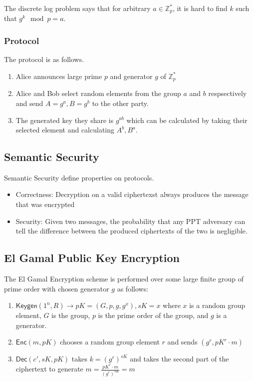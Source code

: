 \documentclass[11pt]{article}
\begin{document}
The discrete log problem says that for arbitrary $a \in \mathbb{Z}_p^*$, it is hard to find $k$ such that $g^k \mod p = a$.

\subsubsection{Protocol}
The protocol is as follows. 
\begin{enumerate}
    \item Alice announces large prime $p$ and generator $g$ of $\mathbb{Z}_p^*$
    \item Alice and Bob select random elements from the group $a$ and $b$ respsectively and send $A=g^a, B=g^b$ to the other party.
    \item The generated key they share is $g^{ab}$ which can be calculated by taking their selected element and calculating $A^b, B^a$.
\end{enumerate}

\subsection{Semantic Security}
Semantic Security define properties on protocols.
\begin{itemize}
    \item Correctness: Decryption on a valid ciphertexst always produces the message that was encrypted
    \item Security: Given two messages, the probability that any PPT adversary can tell the difference between the produced ciphertexts of the two is negligible.
\end{itemize}
\subsection{El Gamal Public Key Encryption}
The El Gamal Encryption scheme is performed over some large finite group of prime order with chosen generator $g$ as follows:
\begin{enumerate}
    \item $\mathsf{Keygen}(1^n,R) \rightarrow pK=(G,p,g,g^x), sK=x$ where $x$ is a random group element, $G$ is the group, $p$ is the prime order of the group, and $g$ is a generator.
    \item $\mathsf{Enc}(m,pK)$ chooses a random group element $r$ and sends $(g^r, pK^r \cdot m)$
    \item $\mathsf{Dec}(c',sK,pK)$ takes $k = (g^r)^{sK}$ and takes the second part of the ciphertext to generate $m = \frac{pK^r \cdot m}{(g^r)^{sK}} = m$
\end{enumerate}
\end{document}
